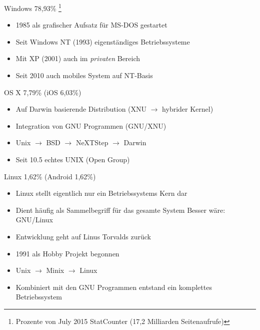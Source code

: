 \documentclass[aspectratio=43]{beamer}
\begin{document}
\begin{frame} 

	\begin{block}{Windows  78,93\% \footnote{Prozente von July 2015 StatCounter (17,2 Milliarden Seitenaufrufe)} }
	\begin{itemize}
	\item 1985 als grafischer Aufsatz für MS-DOS gestartet
	\item Seit Windows NT (1993) eigenständiges Betriebssysteme
	\item Mit XP (2001) auch im \textit{privaten} Bereich
	\item Seit 2010 auch mobiles System auf NT-Basis
	
	
	\end{itemize}
	\end{block}
	
	\begin{block}{OS X 7,79\% (iOS 6,03\%)} 
	\begin{itemize}
	\item Auf Darwin basierende Distribution (XNU $\rightarrow$ hybrider Kernel)
	\item Integration von GNU Programmen (GNU/XNU)
	\item Unix $\rightarrow$ BSD $\rightarrow$ NeXTStep $\rightarrow$ Darwin
	\item Seit 10.5 echtes UNIX (Open Group)
	\end{itemize}
	\end{block}

\end{frame}

\begin{frame} 

	\begin{block}{Linux 1,62\% (Android 1,62\%)} 
	\begin{itemize}
	\item Linux stellt eigentlich nur ein Betriebssystems Kern dar
	\item Dient häufig als Sammelbegriff für das gesamte System
	\newline Besser wäre: GNU/Linux
	\item Entwicklung geht auf Linus Torvalds zurück
	\item 1991 als Hobby Projekt begonnen
	\item Unix $\rightarrow$ Minix $\rightarrow$ Linux
	\item Kombiniert mit den GNU Programmen entstand ein komplettes Betriebssystem 
	\end{itemize}
	\end{block}

\end{frame}
\end{document}
